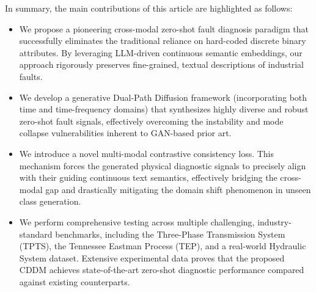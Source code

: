 In summary, the main contributions of this article are highlighted as follows:
\begin{itemize}
    \item We propose a pioneering cross-modal zero-shot fault diagnosis \cite{precup2015overview} paradigm that successfully eliminates the traditional reliance on hard-coded discrete binary attributes. By leveraging LLM-driven continuous semantic embeddings, our approach rigorously preserves fine-grained, textual descriptions of industrial faults.
    \item We develop a generative Dual-Path Diffusion framework (incorporating both time and time-frequency domains) that synthesizes highly diverse and robust zero-shot fault signals, effectively overcoming the instability and mode collapse vulnerabilities inherent to GAN-based prior art.
    \item We introduce a novel multi-modal contrastive consistency loss. This mechanism forces the generated physical diagnostic signals to precisely align with their guiding continuous text semantics, effectively bridging the cross-modal gap and drastically mitigating the domain shift phenomenon in unseen class generation.
    \item We perform comprehensive testing across multiple challenging, industry-standard benchmarks, including the Three-Phase Transmission System (TPTS), the Tennessee Eastman Process (TEP), and a real-world Hydraulic System dataset. Extensive experimental data proves that the proposed CDDM achieves state-of-the-art zero-shot diagnostic performance compared against existing counterparts.
\end{itemize}